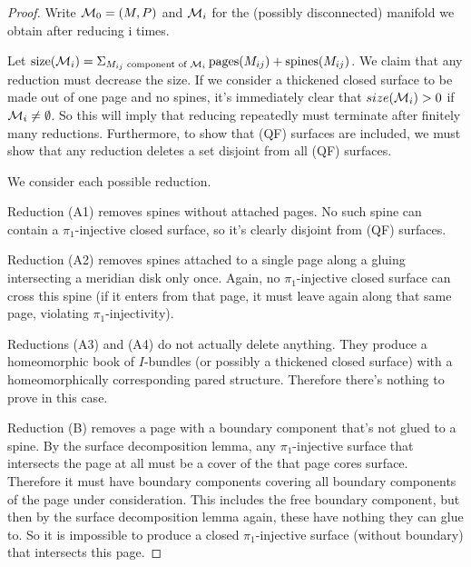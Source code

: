 \begin{proof}

Write $\mathcal{M}_0 = (M,P)$ and $\mathcal{M}_i$ for the (possibly disconnected) manifold we
obtain after reducing i times.

Let $\operatorname{size}(\mathcal{M}_i) = \Sigma_{M_{ij} \text{ component of } \mathcal{M}_i}
\operatorname{pages}(M_{ij}) + \operatorname{spines}(M_{ij})$. We claim that
any reduction must decrease the size. If we consider a thickened closed surface
to be made out of one page and no spines, it's immediately clear that
$size(\mathcal{M}_i)>0$ if $\mathcal{M}_i \neq \emptyset$.  So this will imply that reducing
repeatedly must terminate after finitely many reductions. Furthermore, to show
that (QF) surfaces are included, we must show that any reduction deletes a set
disjoint from all (QF) surfaces.

We consider each possible reduction.

Reduction (A1) removes spines without attached pages. No such spine can contain
a $\pi_1$-injective closed surface, so it's clearly disjoint from (QF) surfaces.

Reduction (A2) removes spines attached to a single page along a gluing
intersecting a meridian disk only once. Again, no $\pi_1$-injective closed surface
can cross this spine (if it enters from that page, it must leave again along
that same page, violating $\pi_1$-injectivity).


Reductions (A3) and (A4) do not actually delete anything. They produce
a homeomorphic book of $I$-bundles (or possibly a thickened closed surface)
with a homeomorphically corresponding pared structure. Therefore there's
nothing to prove in this case.

Reduction (B) removes a page with a boundary component that's not glued to
a spine. By the surface decomposition lemma, any $\pi_1$-injective surface that
intersects the page at all must be a cover of the that page cores surface.
Therefore it must have boundary components covering all boundary components of
the page under consideration. This includes the free boundary component, but
then by the surface decomposition lemma again, these have nothing they can glue
to. So it is impossible to produce a closed $\pi_1$-injective surface (without
boundary) that intersects this page.


\end{proof}
